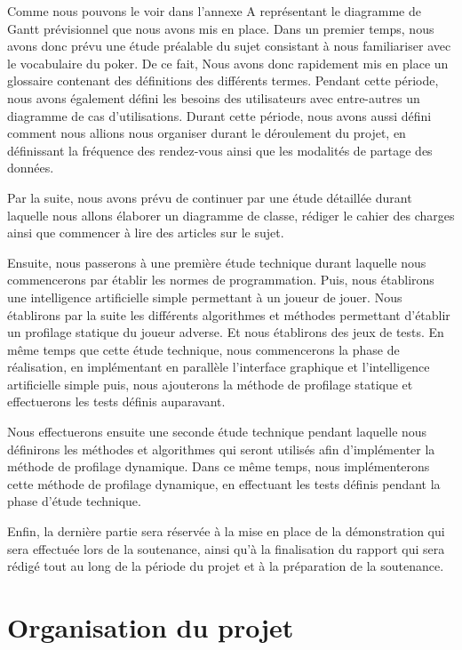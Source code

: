 \documentclass{report}
\begin{document}
\hspace{0.5cm}Comme nous pouvons le voir dans l'annexe A représentant le diagramme de Gantt prévisionnel que nous avons mis en place. Dans un premier temps, nous avons donc prévu une étude préalable du sujet consistant à nous familiariser avec le vocabulaire du poker. De ce fait, Nous avons donc rapidement mis en place un glossaire contenant des définitions des différents termes. Pendant cette période, nous avons également défini les besoins des utilisateurs avec entre-autres un diagramme de cas d'utilisations. Durant cette période, nous avons aussi défini comment nous allions nous organiser durant le déroulement du projet, en définissant la fréquence des rendez-vous ainsi que les modalités de partage des données.\par
Par la suite, nous avons prévu de continuer par une étude détaillée durant laquelle nous allons élaborer un diagramme de classe, rédiger le cahier des charges ainsi que commencer à lire des articles sur le sujet.\par
Ensuite, nous passerons à une première étude technique durant laquelle nous commencerons par établir les normes de programmation. Puis, nous établirons une intelligence artificielle simple permettant à un joueur de jouer. Nous établirons par la suite les différents algorithmes et méthodes permettant d'établir un profilage statique du joueur adverse. Et nous établirons des jeux de tests. En même temps que cette étude technique, nous commencerons la phase de réalisation, en implémentant en parallèle l'interface graphique et l'intelligence artificielle simple puis, nous ajouterons la méthode de profilage statique et effectuerons les tests définis auparavant.\par
Nous effectuerons ensuite une seconde étude technique pendant laquelle nous définirons les méthodes et algorithmes qui seront utilisés afin d'implémenter la méthode de profilage dynamique. Dans ce même temps, nous implémenterons cette méthode de profilage dynamique, en effectuant les tests définis pendant la phase d'étude technique.\par
Enfin, la dernière partie sera réservée à la mise en place de la démonstration qui sera effectuée lors de la soutenance, ainsi qu'à la finalisation du rapport qui sera rédigé tout au long de la période du projet et à la préparation de la soutenance.

\chapter{Organisation du projet}
\end{document}
